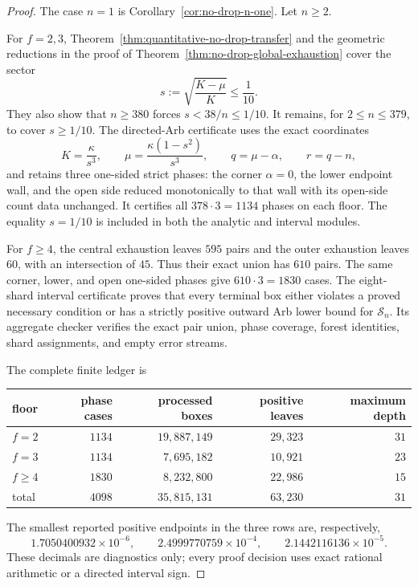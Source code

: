 \documentclass[11pt]{article}
\theoremstyle{remark}
\begin{document}
\begin{proof}
The case $n=1$ is Corollary~\ref{cor:no-drop-n-one}.  Let $n\geq2$.

For $f=2,3$, Theorem~\ref{thm:quantitative-no-drop-transfer} and the
geometric reductions in the proof of
Theorem~\ref{thm:no-drop-global-exhaustion} cover the sector
\[
 s:=\sqrt{\frac{K-\mu}{K}}\leq\frac1{10}.
\]
They also show that $n\geq380$ forces $s<38/n\leq1/10$.  It remains, for
$2\leq n\leq379$, to cover $s\geq1/10$.  The directed-Arb certificate
uses the exact coordinates
\[
 K=\frac\kappa{s^3},\qquad
 \mu=\frac{\kappa(1-s^2)}{s^3},\qquad
 q=\mu-\alpha,\qquad r=q-n,
\]
and retains three one-sided strict phases: the corner
$\alpha=0$, the lower endpoint wall, and the open side reduced
monotonically to that wall with its open-side count data unchanged.  It
certifies all $378\cdot3=1134$ phases on each floor.  The equality
$s=1/10$ is included in both the analytic and interval modules.

For $f\geq4$, the central exhaustion leaves $595$ pairs and the outer
exhaustion leaves $60$, with an intersection of $45$.  Thus their exact
union has $610$ pairs.  The same corner, lower, and open one-sided phases
give $610\cdot3=1830$ cases.  The eight-shard interval certificate proves
that every terminal box either violates a proved necessary condition or
has a strictly positive outward Arb lower bound for $\mathcal S_n$.  Its
aggregate checker verifies the exact pair union, phase coverage, forest
identities, shard assignments, and empty error streams.

The complete finite ledger is
\begin{center}
\small
\begin{tabular}{@{}lrrrr@{}}
\toprule
floor & phase cases & processed boxes & positive leaves & maximum depth\\
\midrule
$f=2$    & $1134$ & $19{,}887{,}149$ & $29{,}323$ & $31$\\
$f=3$    & $1134$ & $ 7{,}695{,}182$ & $10{,}921$ & $23$\\
$f\geq4$ & $1830$ & $ 8{,}232{,}800$ & $22{,}986$ & $15$\\
\midrule
total    & $4098$ & $35{,}815{,}131$ & $63{,}230$ & $31$\\
\bottomrule
\end{tabular}
\end{center}
The smallest reported positive endpoints in the three rows are,
respectively,
\[
 1.7050400932\times10^{-6},\qquad
 2.4999770759\times10^{-4},\qquad
 2.1442116136\times10^{-5}.
\]
These decimals are diagnostics only; every proof decision uses exact
rational arithmetic or a directed interval sign.


\end{proof}
\end{document}
